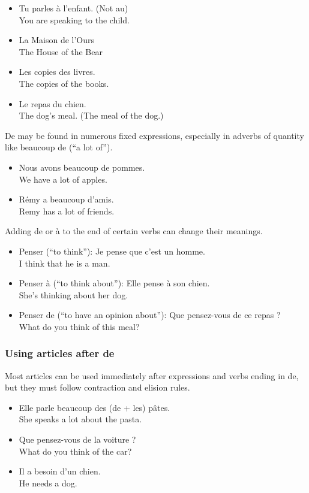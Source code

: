 \begin{itemize}
  \item  Tu parles {\`a} l'enfant. (Not au) \\ You are speaking to the child.
  \item  La Maison de l'Ours \\ The House of the Bear
  \item  Les copies des livres. \\ The copies of the books.
  \item  Le repas du chien. \\ The dog's meal. (The meal of the dog.)
\end{itemize}

De may be found in numerous fixed expressions, especially in adverbs of quantity like \guillemotleft beaucoup de \guillemotright (``a lot of'').

\begin{itemize}
  \item  Nous avons beaucoup de pommes. \\ We have a lot of apples.
  \item  R{\'e}my a beaucoup d'amis. \\ Remy has a lot of friends.
\end{itemize}

Adding de or {\`a} to the end of certain verbs can change their meanings.

\begin{itemize}
  \item  Penser (``to think''): Je pense que c'est un homme. \\ I think that he is a man.
  \item  Penser {\`a} (``to think about''): Elle pense {\`a} son chien. \\ She's thinking about her dog.
  \item  Penser de (``to have an opinion about''): Que pensez-vous de ce repas ? \\ What do you think of this meal?
\end{itemize}

\subsubsection{Using articles after de}

Most articles can be used immediately after expressions and verbs ending in de, but they must follow contraction and elision rules.

\begin{itemize}
  \item  Elle parle beaucoup des (de + les) p{\^a}tes. \\ She speaks a lot about the pasta.
  \item  Que pensez-vous de la voiture ? \\ What do you think of the car?
  \item  Il a besoin d'un chien. \\ He needs a dog.
\end{itemize}


